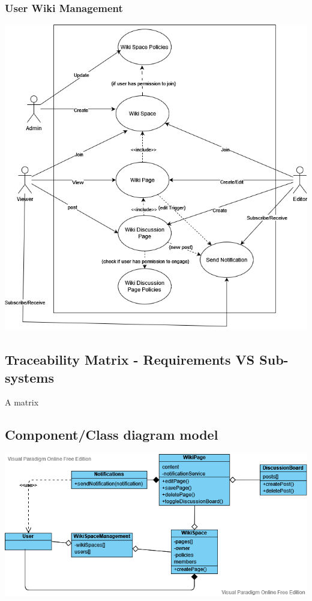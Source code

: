 \documentclass{article}
\begin{document}
\subsubsection{User Wiki Management}
\includegraphics[width=\textwidth]{User-Wiki-Management.png}

\subsection{Traceability Matrix - Requirements VS Sub-systems}

A matrix

\subsection{Component/Class diagram model}

\includegraphics[width=\textwidth]{Class Diagram.png}
\end{document}
